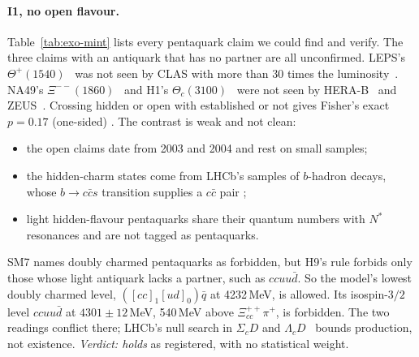 \paragraph{I1, no open flavour.} Table~\ref{tab:exo-mint} lists every pentaquark claim we could find and verify. The three claims with an
antiquark that has no partner are all unconfirmed. LEPS's $\Theta^+(1540)$~\cite{nakano2003} was not seen by CLAS with more than 30
times the luminosity~\cite{mckinnon2006}. NA49's $\Xi^{--}(1860)$~\cite{na492004} and H1's $\Theta_c(3100)$~\cite{h12004} were not seen by
HERA-B~\cite{knoepfle2004} and ZEUS~\cite{zeus2004}. Crossing hidden or open with established or not gives Fisher's exact $p=0.17$
(one-sided) . The contrast is weak and not clean:
\begin{itemize}[leftmargin=*,itemsep=1pt]
\item the open claims date from 2003 and 2004 and rest on small samples;
\item the hidden-charm states come from LHCb's samples of $b$-hadron decays, whose $b\to c\bar cs$ transition supplies a $c\bar c$ pair
\tagP;
\item light hidden-flavour pentaquarks share their quantum numbers with $N^*$ resonances and are not tagged as pentaquarks.
\end{itemize}
SM7 names doubly charmed pentaquarks as forbidden, but H9's rule forbids only those whose light antiquark lacks a partner, such as
$ccuu\bar d$. So the model's lowest doubly charmed level, $([cc]_1[ud]_0)\bar q$ at 4232\,MeV, is allowed. Its isospin-$3/2$ level
$ccuu\bar d$ at $4301\pm12$\,MeV, 540\,MeV above $\Xi_{cc}^{++}\pi^+$, is forbidden. The two readings conflict there; LHCb's null search
in $\Sigma_cD$ and $\Lambda_cD$~\cite{lhcb2024h} bounds production, not existence. \emph{Verdict: holds} as registered, with no
statistical weight.

